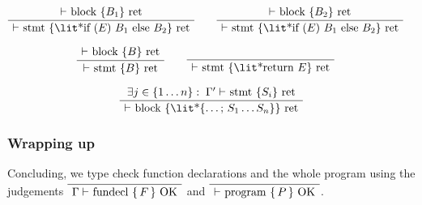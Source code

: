 \documentclass[english,10pt]{article} %
\theoremstyle{definitionstyle}
\theoremstyle{lemmastyle}
\newenvironment{Block}[1]{%
\begin{Warning}[singleextra={\path let \p1=(P), \p2=(O) in ($(\x2,0)+0.5*(0,\y1)$) node[mdframeleftlinetitle] {#1};}]%
}{%
\end{Warning}%
}
\begin{document}
\begin{Block}{Block/stmt returning}

\begin{align*}
\AxiomC{$\vdash $ block \{$B_1$\} ret}
\UnaryInfC{$\vdash $ stmt \{\lit*{if ($E$) $B_1$ else $B_2$}\} ret}
\DisplayProof
&\quad\quad
\AxiomC{$\vdash $ block \{$B_2$\} ret}
\UnaryInfC{$\vdash $ stmt \{\lit*{if ($E$) $B_1$ else $B_2$}\} ret}
\DisplayProof
\end{align*}

\begin{align*}
\AxiomC{$\vdash $ block \{$B$\} ret}
\UnaryInfC{$\vdash $ stmt \{$B$\} ret}
\DisplayProof
&\quad\quad
\AxiomC{\phantom{kelley}}
\UnaryInfC{$\vdash $ stmt \{\lit*{return $E$}\} ret}
\DisplayProof
\end{align*}

\begin{gather*}
\AxiomC{$\exists j \in \{1 \dots n\}:\;\Gamma' \vdash$ stmt \{$S_i$\} ret}
\UnaryInfC{$\vdash $ block \{\lit*{\{$\dots$; $S_1 \dots S_n$\}}\} ret}
\DisplayProof
\end{gather*}

\end{Block}

\subsubsection{Wrapping up}

Concluding, we type check function declarations and the whole program using the judgements $\bottomAlignProof\AxiomC{}\UnaryInfC{$\Gamma \vdash$ fundecl $\{\,F\,\}$ OK}\DisplayProof$ and $\bottomAlignProof\AxiomC{}\UnaryInfC{$\vdash$ program $\{\,P\,\}$ OK}\DisplayProof$.
\end{document}
